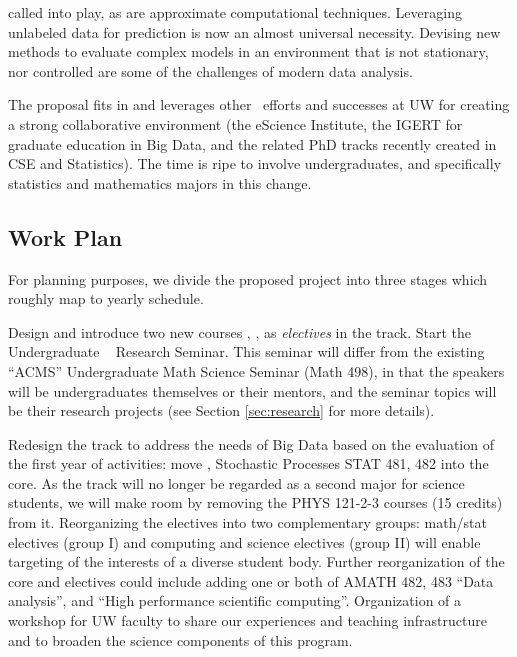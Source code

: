  called into play, as are approximate computational
  techniques. Leveraging unlabeled data for prediction is now an
  almost universal necessity. Devising new methods to evaluate complex
  models in an environment that is not stationary, nor controlled are
  some of the challenges of modern data analysis.
\item The proposal fits in and leverages other \cdse\ efforts and successes at UW for creating a strong collaborative environment (the eScience Institute, the IGERT for graduate education in Big Data, and the related PhD tracks recently created in CSE and Statistics). The time is ripe to involve undergraduates, and specifically statistics and mathematics majors in this change.
\eit

\subsection{Work Plan}

For planning purposes, we divide the proposed project into three stages which
roughly map to yearly schedule. 

 Design and introduce two new courses \statcl, \astrocl,
as {\em electives} in the track.  Start the Undergraduate \cdse~
Research Seminar. This seminar will differ from the existing ``ACMS''
Undergraduate Math Science Seminar ({\sc Math 498}), in that the
speakers will be undergraduates themselves or their mentors, and the
seminar topics will be their research projects (see Section
\ref{sec:research} for more details).

 Redesign the track to address the needs of Big Data
based on the evaluation of the first year of activities: move \statcl,
Stochastic Processes {\sc STAT 481, 482} into the core. As the track
will no longer be regarded as a second major for science students, we
will make room by removing the {\sc PHYS 121-2-3} courses (15 credits)
from it.  Reorganizing the electives into two complementary groups:
math/stat electives (group I) and computing and science electives
(group II) will enable targeting of the interests of a diverse student
body.  Further reorganization of the core and electives could include
adding one or both of {\sc AMATH 482, 483} ``Data analysis'', and
``High performance scientific computing''.
Organization of a workshop for UW faculty to share our experiences and
teaching infrastructure and to broaden the science components of this program.


